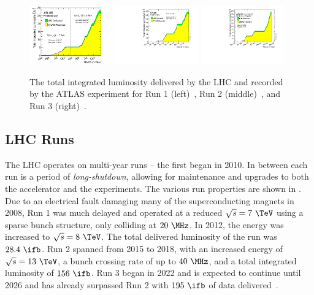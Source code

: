 \begin{figure}
    \centering
    \includegraphics[width=0.32\textwidth]{Figures/cern_atlas/lumi1.pdf}
    \includegraphics[width=0.32\textwidth]{Figures/cern_atlas/lumi2.pdf}
    \includegraphics[width=0.32\textwidth]{Figures/cern_atlas/lumi3.pdf}
    \caption{The total integrated luminosity delivered by the LHC and recorded by the ATLAS experiment for Run 1 (left)~\cite{run1data}, Run 2 (middle)~\cite{run2data}, and Run 3 (right)~\cite{run3data}.}
    \label{fig:luminosity}
\end{figure}

\subsection{LHC Runs}

The LHC operates on multi-year runs -- the first began in 2010.
In between each run is a period of \textit{long-shutdown}, allowing for maintenance and upgrades to both the accelerator and the experiments.
The various run properties are shown in .
Due to an electrical fault damaging many of the superconducting magnets in 2008, Run 1 was much delayed and operated at a reduced $\sqrt{s}=7~\TeV$ using a sparse bunch structure, only colliding at $20~\MHz$.
In 2012, the energy was increased to $\sqrt{s}=8~\TeV$.
The total delivered luminosity of the run was $28.4~\ifb$.
Run 2 spanned from 2015 to 2018, with an increased energy of $\sqrt{s}=13~\TeV$, a bunch crossing rate of up to $40~\MHz$, and a total integrated luminosity of $156~\ifb$.
Run 3 began in 2022 and is expected to continue until 2026 and has already surpassed Run 2 with $195~\ifb$ of data delivered~\cite{run3data}.

